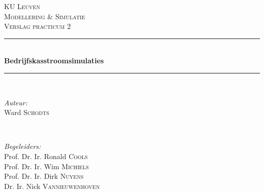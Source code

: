 \documentclass[11pt,a4paper]{article}
\begin{document}
\begin{titlepage}

\newcommand{\HRule}{\rule{\linewidth}{0.5mm}} %

\center %
 

\textsc{\textsc{\LARGE KU Leuven}}\\[1.5cm] %
\textsc{\Large Modellering \& Simulatie}\\[0.5cm] %
\textsc{\large Verslag practicum 2}\\[0.5cm] %


\HRule \\[0.4cm]
{ \huge \bfseries Bedrijfskasstroomsimulaties}\\[0.4cm] %
\HRule \\[1.5cm]
 

\begin{minipage}{0.4\textwidth}
\begin{flushleft} \large
\emph{Auteur:}\\
Ward \textsc{Schodts} %
\end{flushleft}
\end{minipage}
~
\begin{minipage}{0.4\textwidth}
\begin{flushright} \large
\emph{Begeleiders:} \\
Prof. Dr. Ir. Ronald \textsc{Cools} \\ %
Prof. Dr. Ir. Wim \textsc{Michiels} \\ %
Prof. Dr. Ir. Dirk \textsc{Nuyens} \\ %
Dr. Ir. Nick \textsc{Vannieuwenhoven} \\ %
\end{flushright}
\end{minipage}\\[4cm]


\end{titlepage}
\end{document}
